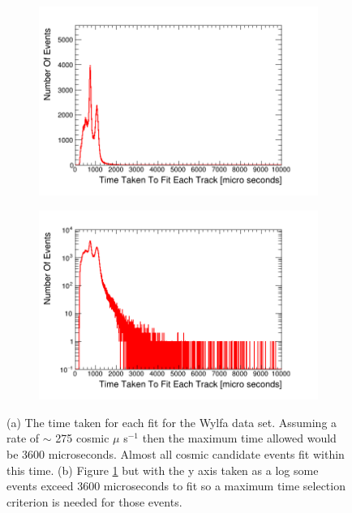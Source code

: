 \begin{figure}[!h]
\centering
\begin{subfigure}{.5\textwidth}
  \centering
  \includegraphics[width=\linewidth]{Chapter5/Figs/Raster/wylfaTrackerTime.png}
  \captionsetup{width=.9\linewidth}
  \caption{}
  \label{subFig:wylfaTrackerTime}
\end{subfigure}%
\begin{subfigure}{.5\textwidth}
  \centering
\includegraphics[width=\linewidth]{Chapter5/Figs/Raster/wylfaTrackerTimeLog.png}
  \captionsetup{width=.9\linewidth}
  \caption{}
  \label{subFig:wylfaTrackerTimeLog}
\end{subfigure}
\caption{(a) The time taken for each fit for the Wylfa data set. Assuming a rate of $\sim$ 275 cosmic $\mu$ s$^{-1}$ then the maximum time allowed would be 3600 microseconds. Almost all cosmic candidate events fit within this time. (b) Figure \ref{subFig:wylfaTrackerTime} but with the y axis taken as a log some events exceed 3600 microseconds to fit so a maximum time selection criterion is needed for those events.}
\label{fig:wylfaTrackerTimeAndLog}
\end{figure}

